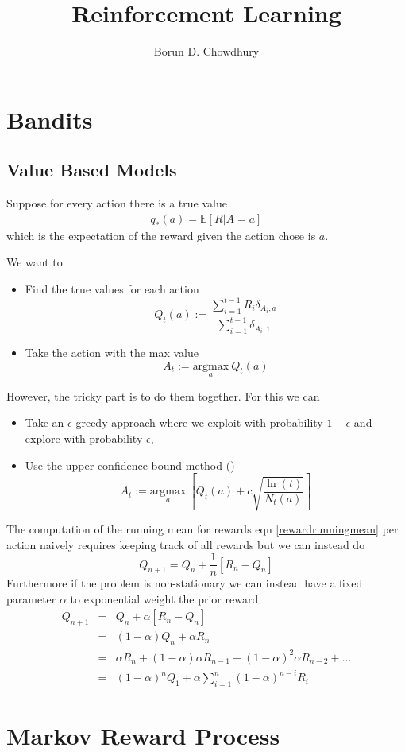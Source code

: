 \documentclass[11pt,a4paper]{article}
\title{Reinforcement Learning}
\author{Borun D. Chowdhury}
\newcommand\be{\begin{equation}}
\newcommand\bea{\begin{eqnarray}}
\newcommand\ee{\end{equation}}
\newcommand\eea{\end{eqnarray}}
\newcommand{\nn}{\nonumber \\}
\newcommand{\e}[1]{\mathbb E[#1]}
\newcommand{\todo}[1]{{\color{cyan}{TODO: #1}}}
\begin{document}
\maketitle

\section{Bandits}

\subsection{Value Based Models}

Suppose for every action there is a true value
\bea
q_*(a) = \e{R|A=a}
\eea
which is the expectation of the reward given the action chose is $a$.

We want to 
\begin{itemize}
\item Find the true values for each action
\be
Q_t(a) := \frac{\sum_{i=1}^{t-1} R_i \delta_{A_i,a}}{\sum_{i=1}^{t-1}  \delta_{A_i,1}} \label{rewardrunningmean}
\ee
\item Take the action with the max value
\be
A_t := \underset{a}{\text{argmax}} ~ Q_t(a)
\ee
\end{itemize}

However, the tricky part is to do them together. For this we can 
\begin{itemize}
\item Take an $\epsilon$-greedy approach where we exploit with probability $1-\epsilon$ and explore with probability $\epsilon$,
\item Use the upper-confidence-bound method (\todo{find the math behind this})
\be
A_t := \underset{a}{\text{argmax}} ~ \left[ Q_t(a) + c \sqrt{\frac{\ln(t)}{N_t(a)}}\right]
\ee
\end{itemize}

The computation of the running mean for rewards eqn \ref{rewardrunningmean} per action naively requires keeping track of all rewards but we can instead do
\be
Q_{n+1} = Q_n + \frac{1}{n} [R_n - Q_n]
\ee
Furthermore if the problem is non-stationary we can instead have a fixed parameter $\alpha$ to exponential weight the prior reward
\bea
Q_{n+1} &=& Q_n + \alpha [R_n - Q_n] \nn
&=& (1-\alpha) Q_n + \alpha R_n \nn
&=& \alpha R_n + (1-\alpha) \alpha R_{n-1} + (1-\alpha)^2 \alpha R_{n-2}  + \dots \nn
&=& (1-\alpha)^n Q_1 + \alpha \sum_{i=1}^n (1-\alpha)^{n-i} R_i
\eea

\section{Markov Reward Process}
\end{document}
